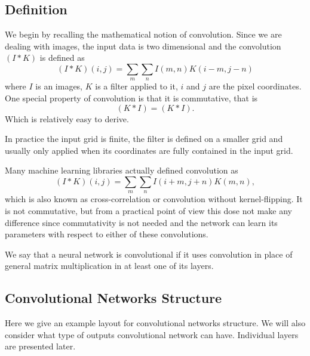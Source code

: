 \documentclass[]{article}
\begin{document}
\subsection{Definition}
We begin by recalling the mathematical notion of convolution.
Since we are dealing with images, the input data is two dimensional and the convolution
$(I * K)$ is defined as
%
\[
(I * K)(i, j) = \sum_m \sum_n I(m , n) K(i - m, j - n)
\]
where $I$ is an images, $K$ is a filter applied to it, $i$ and $j$ are the
pixel coordinates. One special property of convolution is that it is commutative, that is
\[
 (K * I) = (K * I).
\]
Which is relatively easy to derive.

In practice the input grid is finite, the filter is defined on a smaller grid and
usually only applied when its coordinates are fully contained in the input grid.

Many machine learning libraries actually defined convolution as
\[
(I * K)(i, j) = \sum_m \sum_n I(i + m , j + n) K(m, n),
\]
which is also known as cross-correlation or convolution without kernel-flipping.
It is not commutative, but from a practical point of view this dose not make any difference
since commutativity is not needed and the network can learn its parameters with
respect to either of these convolutions.

We say that a neural network is convolutional if it uses convolution in place of
general matrix multiplication in at least one of its layers.


\subsection{Convolutional Networks Structure}
Here we give an example layout for convolutional networks structure. We will also
consider what type of outputs convolutional network can have. Individual layers are
presented later.
\end{document}
